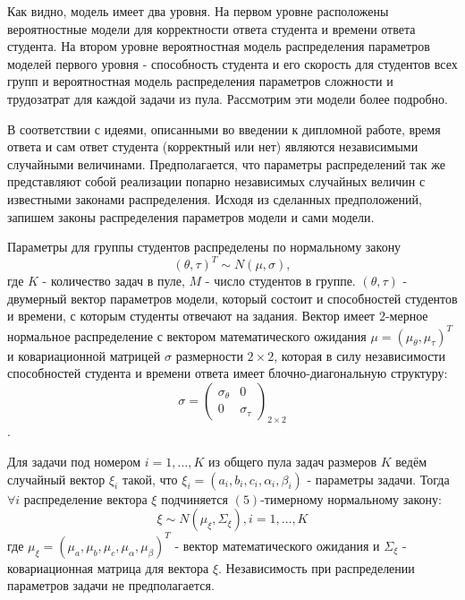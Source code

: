 Как видно, модель имеет два уровня. На первом уровне расположены вероятностные модели для корректности ответа студента и времени ответа студента. На втором уровне вероятностная модель распределения параметров  моделей первого уровня - способность студента и его скорость для студентов всех групп и вероятностная модель распределения параметров сложности и трудозатрат для каждой задачи из пула. Рассмотрим эти модели более подробно.

В соответствии с идеями, описанными во введении к дипломной работе, время ответа и сам ответ студента (корректный или нет) являются неза\-висимыми случайными величинами. Предполагается, что параметры распре\-делений так же представляют собой реализации попарно независимых слу\-чайных величин с известными законами распределения. Исходя из сделанных предположений, запишем законы распределения параметров модели и сами модели. 

Параметры для группы студентов распределены по нормальному закону
\begin{equation}
(\theta,\tau)^T \sim N(\mu,\sigma),
\end{equation}
где $K$ - количество задач в пуле, $M$ - число студентов в группе. $(\theta,\tau)$ - двумерный вектор параметров модели, который состоит и способностей сту\-дентов и времени, с которым студенты отвечают на задания. Вектор имеет $2$-мерное нормальное распределение с вектором матема\-тического ожидания $\mu = (\mu_\theta, \mu_\tau)^T$ и ковариационной матрицей $\sigma$ размер\-ности $2\times 2$, которая в силу независимости способностей студента и времени ответа имеет блочно-диагональную структуру:
$$
\sigma = 
\left(
\begin{array}{cc}
\sigma_\theta & 0\\
0 &\sigma_\tau
\end{array}
\right)_{2\times2}
$$.

Для задачи под номером $i=1,\ldots,K$ из общего пула задач размеров $K$ ведём случайный вектор $\xi_i$ такой, что $\xi_i = (a_i,b_i,c_i,\alpha_i, \beta_i)$ - параметры задачи. Тогда $\forall i$ распределение вектора $\xi$ подчиняется $(5)$-тимерному нор\-мальному  закону:
\begin{equation}
\xi \sim N(\mu_\xi ,\Sigma_\xi ), i=1,\ldots,K
\end{equation}
где $\mu_\xi =(\mu_a,\mu_b,\mu_c,\mu_\alpha, \mu_\beta)^T$ - вектор математического ожидания и $\Sigma_\xi$ - кова\-риационная матрица для вектора  $\xi$. Независимость при распределении па\-раметров задачи не предполагается.


